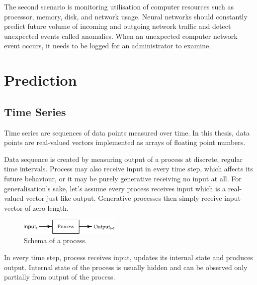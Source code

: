 \documentclass[12pt,oneside]{fithesis2}
\begin{document}
\par %
The second scenario is monitoring utilisation of computer resources such as processor, memory, disk, and network usage. Neural networks should constantly predict future volume of incoming and outgoing network traffic and detect unexpected events called anomalies. When an unexpected computer network event occurs, it needs to be logged for an administrator to examine.
\par

\chapter{Prediction}
\section{Time Series}
Time series are sequences of data points measured over time. In this thesis, data points are real-valued vectors implemented as arrays of floating point numbers. \par
Data sequence is created by measuring output of a process at discrete, regular time intervals. Process may also receive input in every time step, which affects its future behaviour, or it may be purely generative receiving no input at all. For generalisation's sake, let's assume every process receives input which is a real-valued vector just like output. Generative processes then simply receive input vector of zero length.
	\begin{figure}[ht]
		\centering
		\includegraphics[width=182px]{process.png}
		\caption{Schema of a process.}
	\end{figure}
In every time step, process receives input, updates its internal state and produces output. Internal state of the process is usually hidden and can be observed only partially from output of the process. %
\end{document}
